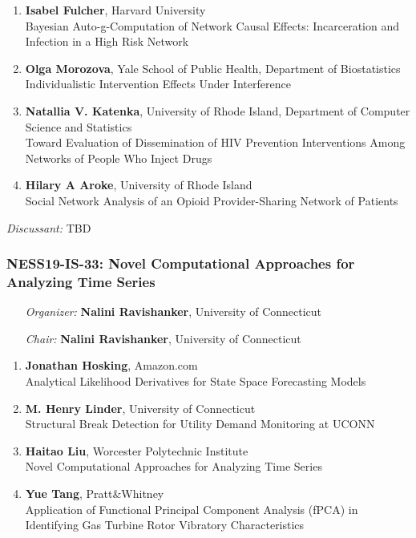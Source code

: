 \begin{enumerate}
\item \textbf{Isabel Fulcher}, Harvard University \\
Bayesian Auto-g-Computation of Network Causal Effects: Incarceration and Infection in a High Risk Network
\item \textbf{Olga Morozova}, Yale School of Public Health, Department of Biostatistics \\
Individualistic Intervention Effects Under Interference
\item \textbf{Natallia V. Katenka}, University of Rhode Island, Department of Computer Science and Statistics \\
Toward Evaluation of Dissemination of HIV Prevention Interventions Among Networks of People Who Inject Drugs
\item \textbf{Hilary A Aroke}, University of Rhode Island \\
Social Network Analysis of an Opioid Provider-Sharing Network of Patients
\end{enumerate}

\emph{Discussant:} TBD

\subsubsection*{NESS19-IS-33: Novel Computational Approaches for Analyzing Time Series}

\begin{enumerate}[align=left]
\item [\emph{Organizer:}] \textbf{Nalini Ravishanker}, University of Connecticut
\item [\emph{Chair:}] \textbf{Nalini Ravishanker}, University of Connecticut
\end{enumerate}

\begin{enumerate}
\item \textbf{Jonathan Hosking}, Amazon.com \\
Analytical Likelihood Derivatives for State Space Forecasting Models
\item \textbf{M. Henry Linder}, University of Connecticut \\
Structural Break Detection for Utility Demand Monitoring at UCONN
\item \textbf{Haitao Liu}, Worcester Polytechnic Institute \\
Novel Computational Approaches for Analyzing Time Series
\item \textbf{Yue Tang}, Pratt\&Whitney \\
Application of Functional Principal Component Analysis (fPCA) in Identifying Gas Turbine Rotor Vibratory Characteristics
\end{enumerate}

